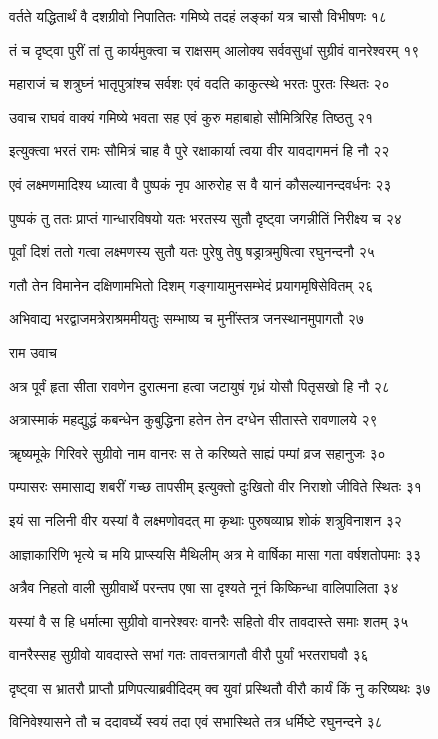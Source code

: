 वर्तते यद्धितार्थं वै दशग्रीवो निपातितः
गमिष्ये तदहं लङ्कां यत्र चासौ विभीषणः १८

तं च दृष्ट्वा पुरीं तां तु कार्यमुक्त्वा च राक्षसम्
आलोक्य सर्ववसुधां सुग्रीवं वानरेश्वरम् १९

महाराजं च शत्रुघ्नं भातृपुत्रांश्च सर्वशः
एवं वदति काकुत्स्थे भरतः पुरतः स्थितः २०

उवाच राघवं वाक्यं गमिष्ये भवता सह
एवं कुरु महाबाहो सौमित्रिरिह तिष्ठतु २१

इत्युक्त्वा भरतं रामः सौमित्रं चाह वै पुरे
रक्षाकार्या त्वया वीर यावदागमनं हि नौ २२

एवं लक्ष्मणमादिश्य ध्यात्वा वै पुष्पकं नृप
आरुरोह स वै यानं कौसल्यानन्दवर्धनः २३

पुष्पकं तु ततः प्राप्तं गान्धारविषयो यतः
भरतस्य सुतौ दृष्ट्वा जगन्नीतिं निरीक्ष्य च २४

पूर्वां दिशं ततो गत्वा लक्ष्मणस्य सुतौ यतः
पुरेषु तेषु षड्रात्रमुषित्वा रघुनन्दनौ २५

गतौ तेन विमानेन दक्षिणामभितो दिशम्
गङ्गायामुनसम्भेदं प्रयागमृषिसेवितम् २६

अभिवाद्य भरद्वाजमत्रेराश्रममीयतुः
सम्भाष्य च मुनींस्तत्र जनस्थानमुपागतौ २७

राम उवाच

अत्र पूर्वं हृता सीता रावणेन दुरात्मना
हत्वा जटायुषं गृध्रं योसौ पितृसखो हि नौ २८

अत्रास्माकं महद्युद्धं कबन्धेन कुबुद्धिना
हतेन तेन दग्धेन सीतास्ते रावणालये २९

ॠष्यमूके गिरिवरे सुग्रीवो नाम वानरः
स ते करिष्यते साह्यं पम्पां व्रज सहानुजः ३०

पम्पासरः समासाद्य शबरीं गच्छ तापसीम्
इत्युक्तो दुःखितो वीर निराशो जीविते स्थितः ३१

इयं सा नलिनी वीर यस्यां वै लक्ष्मणोवदत्
मा कृथाः पुरुषव्याघ्र शोकं शत्रुविनाशन ३२

आज्ञाकारिणि भृत्ये च मयि प्राप्स्यसि मैथिलीम्
अत्र मे वार्षिका मासा गता वर्षशतोपमाः ३३

अत्रैव निहतो वाली सुग्रीवार्थे परन्तप
एषा सा दृश्यते नूनं किष्किन्धा वालिपालिता ३४

यस्यां वै स हि धर्मात्मा सुग्रीवो वानरेश्वरः
वानरैः सहितो वीर तावदास्ते समाः शतम् ३५

वानरैस्सह सुग्रीवो यावदास्ते सभां गतः
तावत्तत्रागतौ वीरौ पुर्यां भरतराघवौ ३६

दृष्ट्वा स भ्रातरौ प्राप्तौ प्रणिपत्याब्रवीदिदम्
क्व युवां प्रस्थितौ वीरौ कार्यं किं नु करिष्यथः ३७

विनिवेश्यासने तौ च ददावर्घ्ये स्वयं तदा
एवं सभास्थिते तत्र धर्मिष्टे रघुनन्दने ३८

